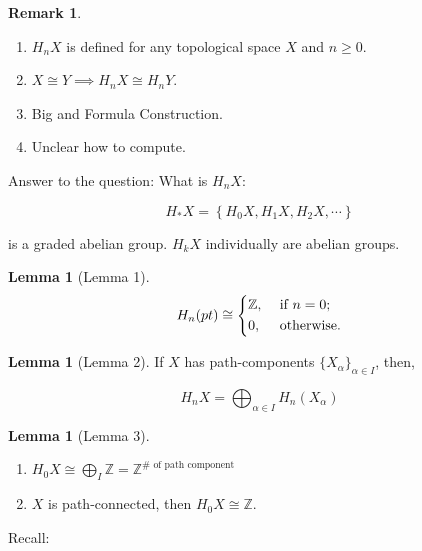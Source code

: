 \documentclass{article}
\theoremstyle{definition}
\newtheorem{lemma}[theorem]{Lemma}
\newtheorem*{remark}{Remark}
\begin{document}
    \begin{remark}
        \begin{enumerate}[label=\arabic*)]
            \item \(H_n X\) is defined for any topological space \(X\) and \(n \geq 0\).
            
            \item \(X \cong Y \implies H_n X \cong H_n Y\).
            
            \item Big and Formula Construction.
            
            \item Unclear how to compute.
        \end{enumerate} 
    \end{remark}

    Answer to the question: What is \(H_n X\):

    \[
        H_{\ast} X = \left\{ H_0 X, H_1 X, H_2 X , \cdots  \right\} 
    \]

    is a graded abelian group. \(H_k X\) individually are abelian groups.

    \begin{lemma}[Lemma 1]
        \[
            H_n(pt) \cong \begin{dcases}
                \mathbb{Z}, &\text{ if } n = 0 ;\\
                0, &\text{ otherwise} .
            \end{dcases}
        \]
    \end{lemma}

    \begin{lemma}[Lemma 2]
        If \(X\) has path-components \(\{ X_\alpha \}_{\alpha \in I}\), then,

        \[
            H_n X = \bigoplus_{\alpha \in I} H_n (X_\alpha)
        \]
    \end{lemma}

    \begin{lemma}
        [Lemma 3]
        \begin{enumerate}[label=\alph*)]
            \item \( H_0 X \cong \bigoplus_{I} \mathbb{Z} = \mathbb{Z}^{\# \text{ of path component}}\)
            \item \(X\) is path-connected, then \(H_0 X \cong \mathbb{Z}\).
        \end{enumerate} 
    \end{lemma}

    Recall:
\end{document}
